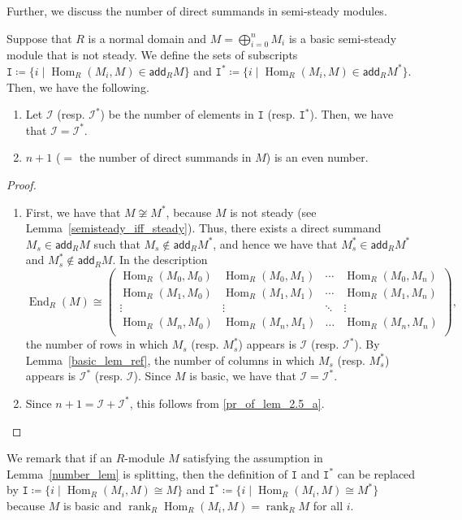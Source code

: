 \documentclass[ALCO,ThmDefs,Unicode]{cedram}
\newcommand{\calI}{\mathcal{I}}
\newcommand{\ttI}{\mathtt{I}}
\DeclareMathOperator{\rank}{rank}
\DeclareMathOperator{\Hom}{Hom}
\DeclareMathOperator{\End}{End}
\newcommand{\add}{\mathsf{add}}
\begin{document}
Further, we discuss the number of direct summands in semi-steady modules.

\begin{lemm}\label{number_lem}
Suppose that $R$ is a normal domain and $M=\bigoplus_{i=0}^nM_i$ is a basic semi-steady module that is not steady. We define the sets of subscripts $\ttI\coloneqq\{i \mid \Hom_R(M_i,M)\in \add_RM\}$ and $\ttI^*\coloneqq\{i \mid \Hom_R(M_i,M)\in \add_RM^*\}$. Then, we have the following.
\begin{enumerate}%
\item\label{lem2-5_a} Let $\calI$ (resp. $\calI^*$) be the number of elements in $\ttI$ (resp. $\ttI^*$). Then, we have that $\calI=\calI^*$.
\item\label{lem2-5_b} $n+1$ ($=$ the number of direct summands in $M$) is an even number.
\end{enumerate}
\end{lemm}

\begin{proof}\ 

\begin{enumerate}%
\item\label{pr_of_lem_2.5_a}
First, we have that $M\not\cong M^*$, because $M$ is not steady (see Lemma~\ref{semisteady_iff_steady}). Thus, there exists a direct summand $M_s\in\add_RM$ such that $M_s\not\in\add_RM^*$, and hence we have that $M_s^*\in\add_RM^*$ and $M_s^*\not\in\add_RM$. In the description
\[
\End_R(M)\cong
\begin{pmatrix}
\Hom_R(M_0,M_0)&\Hom_R(M_0,M_1)&\cdots&\Hom_R(M_0,M_n) \\
\Hom_R(M_1,M_0)&\Hom_R(M_1,M_1)&\cdots&\Hom_R(M_1,M_n) \\
\vdots&\vdots&\ddots&\vdots \\
\Hom_R(M_n,M_0)&\Hom_R(M_n,M_1)&\dots&\Hom_R(M_n,M_n) \\
\end{pmatrix},
\]
the number of rows in which $M_s$ (resp. $M_s^*$) appears is $\calI$ (resp. $\calI^*$). By Lemma~\ref{basic_lem_ref}, the number of columns in which $M_s$ (resp. $M_s^*$) appears is $\calI^*$ (resp. $\calI$). Since $M$ is basic, we have that $\calI=\calI^*$.

\item\label{pr_of_lem_2.5_b}
Since $n+1=\calI+\calI^*$, this follows from \eqref{pr_of_lem_2.5_a}.\qedhere
\end{enumerate}
\end{proof}

We remark that if an $R$-module $M$ satisfying the assumption in Lemma~\ref{number_lem} is splitting, then the definition of $\ttI$ and $\ttI^*$ can be replaced by $\ttI\coloneqq\{i \mid \Hom_R(M_i,M)\cong M\}$ and $\ttI^*\coloneqq\{i \mid \Hom_R(M_i,M)\cong M^*\}$ because $M$ is basic and $\rank_R\Hom_R(M_i,M)=\rank_RM$ for all $i$.
\end{document}
